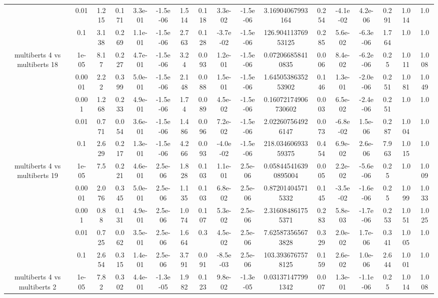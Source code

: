 \begin{tabular}{|c|c|c|c|c|c|c|c|c|c|c|c|c|c|c|c|c|}
 & 0.01 & 1.215 & 0.171 & 3.3e-01 & -1.5e-06 & 1.514 & 0.118 & 3.3e-02 & -1.5e-06 & 3.16904067993164 & 0.254 & -4.1e-02 & 4.2e-06 & 0.291 & 1.014 & 1.0 \\
 & 0.1 & 3.138 & 0.269 & 1.1e-01 & -1.5e-06 & 2.763 & 0.128 & -3.7e-02 & -1.5e-06 & 126.90411376953125 & 0.285 & 5.6e-02 & -6.3e-06 & 1.764 & 1.0 & 1.0 \\
\hline
\multirow{5}{*}{multiberts 4 vs multiberts 18} & 1e-05 & 8.17 & 0.227 & 4.7e-01 & -1.5e-06 & 3.24 & 0.093 & 1.2e-01 & -1.5e-06 & 0.072066858410835 & 0.006 & 8.4e-02 & -6.2e-06 & 0.25 & 1.011 & 1.008 \\
 & 0.0001 & 2.22 & 0.399 & 5.0e-01 & -1.5e-06 & 2.148 & 0.088 & 1.5e-01 & -1.5e-06 & 1.6450538635253902 & 0.146 & 1.3e-01 & -2.0e-06 & 0.251 & 1.081 & 1.049 \\
 & 0.001 & 1.268 & 0.233 & 4.9e-01 & -1.5e-06 & 1.74 & 0.089 & 4.5e-02 & -1.5e-06 & 0.16072174906730602 & 0.003 & 6.5e-02 & -2.4e-06 & 0.251 & 1.0 & 1.0 \\
 & 0.01 & 0.771 & 0.054 & 3.6e-01 & -1.5e-06 & 1.486 & 0.096 & 7.2e-02 & -1.5e-06 & 2.022607564926147 & 0.073 & -6.8e-02 & 1.5e-06 & 0.287 & 1.004 & 1.0 \\
 & 0.1 & 2.629 & 0.217 & 1.3e-01 & -1.5e-06 & 4.266 & 0.093 & -4.0e-02 & -1.5e-06 & 218.03460693359375 & 0.454 & 6.9e-02 & 2.6e-06 & 7.963 & 1.015 & 1.0 \\
\hline
\multirow{5}{*}{multiberts 4 vs multiberts 19} & 1e-05 & 7.5 & 0.221 & 4.6e-01 & 2.5e-06 & 1.828 & 0.103 & 1.1e-01 & 2.5e-06 & 0.058445416390895004 & 0.005 & 2.2e-02 & -5.6e-06 & 0.25 & 1.0 & 1.009 \\
 & 0.0001 & 2.076 & 0.345 & 5.0e-01 & 2.5e-06 & 1.135 & 0.103 & 6.8e-02 & 2.5e-06 & 0.872014045715332 & 0.145 & -3.5e-02 & -1.6e-06 & 0.25 & 1.099 & 1.033 \\
 & 0.001 & 0.88 & 0.131 & 4.9e-01 & 2.5e-06 & 1.074 & 0.107 & 5.3e-02 & 2.5e-06 & 2.316084861755371 & 0.283 & 5.8e-03 & -1.7e-06 & 0.253 & 1.051 & 1.025 \\
 & 0.01 & 0.725 & 0.062 & 3.5e-01 & 2.5e-06 & 1.664 & 0.3 & 4.5e-02 & 2.5e-06 & 7.625873565673828 & 0.329 & 2.0e-02 & 1.7e-06 & 0.341 & 1.005 & 1.0 \\
 & 0.1 & 2.654 & 0.315 & 1.4e-01 & 2.5e-06 & 3.791 & 0.091 & -8.5e-03 & 2.5e-06 & 103.3936767578125 & 0.159 & 2.6e-02 & 1.0e-06 & 2.644 & 1.001 & 1.0 \\
\hline
\multirow{5}{*}{multiberts 4 vs multiberts 2} & 1e-05 & 7.82 & 0.302 & 4.4e-01 & -1.3e-05 & 1.982 & 0.123 & 9.8e-02 & -1.3e-05 & 0.031371477991342 & 0.007 & 1.3e-01 & -1.1e-06 & 0.25 & 1.014 & 1.008 \\

\end{tabular}
